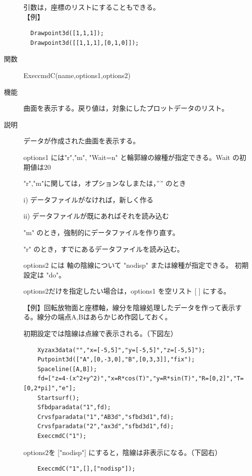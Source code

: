 \documentclass[papersize,a4paper,12pt,uplatex]{jsarticle}
\begin{document}
\begin{description}
引数は，座標のリストにすることもできる。\\
\vspace{\baselineskip}
【例】
\begin{verbatim}
  Drawpoint3d([1,1,1]);
  Drawpoint3d([[1,1,1],[0,1,0]]);
\end{verbatim}
\vspace{\baselineskip}

\hypertarget{execcmdc}{}
\item[関数]  ExeccmdC(name,options1,options2)
\item[機能]  曲面を表示する。戻り値は，対象にしたプロットデータのリスト。
\item[説明]  データが作成された曲面を表示する。

options1 には"r","m", "Wait=n" と輪郭線の線種が指定できる。Wait の初期値は20

  "r","m"に関しては，オプションなしまたは，”” のとき
  
    i) データファイルがなければ，新しく作る
    
    ii) データファイルが既にあればそれを読み込む
    
  "m"  のとき，強制的にデータファイルを作り直す。
  
  "r" のとき，すでにあるデータファイルを読み込む。
  
options2 には 軸の陰線について "nodisp" または線種が指定できる。 初期設定は "do"。

options2だけを指定したい場合は，options1 を空リスト [ ] にする。


\vspace{\baselineskip}
【例】回転放物面と座標軸，線分を陰線処理したデータを作って表示する。線分の端点A,Bはあらかじめ作図しておく。

 初期設定では陰線は点線で表示される。（下図左）
\begin{verbatim}
    Xyzax3data("","x=[-5,5]","y=[-5,5]","z=[-5,5]");
    Putpoint3d(["A",[0,-3,0],"B",[0,3,3]],"fix");
    Spaceline([A,B]);
    fd=["z=4-(x^2+y^2)","x=R*cos(T)","y=R*sin(T)","R=[0,2]","T=[0,2*pi]","e"];
    Startsurf();
    Sfbdparadata("1",fd);
    Crvsfparadata("1","AB3d","sfbd3d1",fd);
    Crvsfparadata("2","ax3d","sfbd3d1",fd);
    ExeccmdC("1");
\end{verbatim}
options2を ["nodisp"] にすると，陰線は非表示になる。（下図右）
\begin{verbatim}
    ExeccmdC("1",[],["nodisp"]);
\end{verbatim}

        \begin{center}       \end{center}


\end{description}
\end{document}
